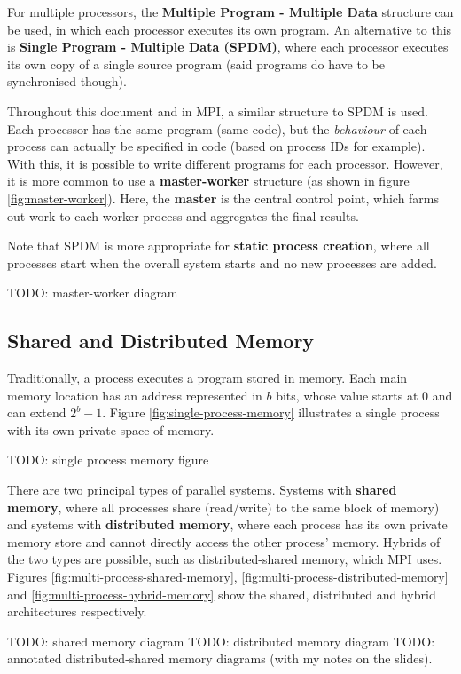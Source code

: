 \documentclass{article}
\begin{document}
For multiple processors, the \textbf{Multiple Program - Multiple Data} structure can be used, in which each processor executes its own program. An alternative to this is \textbf{Single Program - Multiple Data (SPDM)}, where each processor executes its own copy of a single source program (said programs do have to be synchronised though).

Throughout this document and in MPI, a similar structure to SPDM is used. Each processor has the same program (same code), but the \textit{behaviour} of each process can actually be specified in code (based on process IDs for example).  With this, it is possible to write different programs for each processor. However, it is more common to use a \textbf{master-worker} structure (as shown in figure \ref{fig:master-worker}). Here, the \textbf{master} is the central control point, which farms out work to each worker process and aggregates the final results.

Note that SPDM is more appropriate for \textbf{static process creation}, where all processes start when the overall system starts and no new processes are added.

TODO: master-worker diagram

\subsection{Shared and Distributed Memory}

Traditionally, a process executes a program stored in memory. Each main memory location has an address represented in $b$ bits, whose value starts at 0 and can extend $2^b - 1$. Figure \ref{fig:single-process-memory} illustrates a single process with its own private space of memory.

TODO: single process memory figure

There are two principal types of parallel systems. Systems with \textbf{shared memory}, where all processes share (read/write) to the same block of memory) and systems with \textbf{distributed memory}, where each process has its own private memory store and cannot directly access the other process' memory. Hybrids of the two types are possible, such as distributed-shared memory, which MPI uses. Figures \ref{fig:multi-process-shared-memory}, \ref{fig:multi-process-distributed-memory} and \ref{fig:multi-process-hybrid-memory}  show the shared, distributed and hybrid architectures respectively.

TODO: shared memory diagram
TODO: distributed memory diagram
TODO: annotated distributed-shared memory diagrams (with my notes on the slides).
\end{document}
